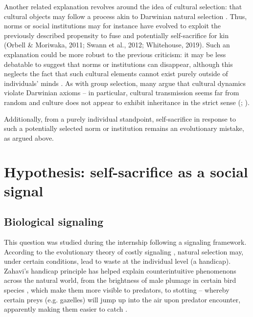 \documentclass[a4paper,12pt]{report}
\begin{document}

Another related explanation revolves around the idea of cultural selection:
that cultural objects may follow a process akin to Darwinian natural selection
\cite{richerson_cultural_2016}. Thus, norms or social institutions may for instance have
evolved to exploit the previously described propensity to fuse and potentially
self-sacrifice for kin (Orbell \& Moriwaka, 2011; Swann et al., 2012; Whitehouse, 2019).
Such an explanation could be more robust to the previous criticism: it may be less
debatable to suggest that norms or institutions can disappear, although this neglects
the fact that such cultural elements cannot exist purely outside of individuals’ minds
\cite{boyer_minds_2018}. As with group selection, many argue that cultural dynamics violate
Darwinian axioms – in particular, cultural transmission seems far from random and
culture does not appear to exhibit inheritance in the strict sense
(; ).

Additionally, from a purely individual standpoint,
self-sacrifice in response to such a potentially selected norm or institution
remains an evolutionary mistake, as argued above.

\section{Hypothesis: self-sacrifice as a social signal}
\label{s:ss_sgl}
\subsection{Biological signaling}
This question was studied during the internship following a signaling framework.
According to the evolutionary theory of costly signaling \cite{zahavi_mate_1975},
natural selection may, under certain conditions, lead to waste at the individual level
(a handicap). Zahavi’s handicap principle has helped explain counterintuitive phenomenons
across the natural world, from the brightness of male plumage in certain bird species
\cite{zahavi_mate_1975}, which make them more visible to predators, to stotting –
whereby certain preys (e.g. gazelles) will jump up into the air upon predator encounter,
apparently making them easier to catch \cite{maynard_smith_animal_2003}.
\end{document}
